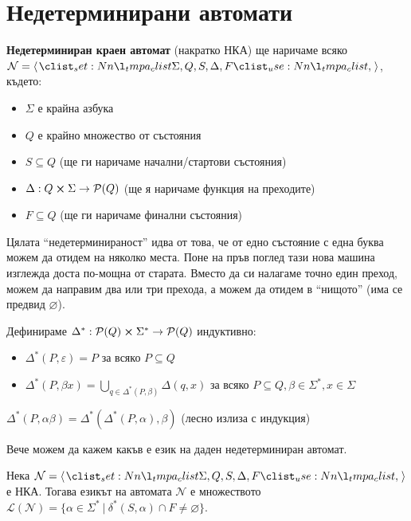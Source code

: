 \section{Недетерминирани автомати}

\begin{definition}
    \textbf{Недетерминиран краен автомат} (накратко НКА) ще наричаме всяко $\mathcal{N} = \opair{\Sigma, Q, S, \Delta, F}$, където:
    \begin{itemize}
        \item $\Sigma$ е крайна азбука
        \item $Q$ е крайно множество от състояния
        \item $S \subseteq Q$ (ще ги наричаме начални/стартови състояния)
        \item $\Delta : Q \cross \Sigma \rightarrow \mathcal{P}(Q)$ (ще я наричаме функция на преходите)
        \item $F \subseteq Q$ (ще ги наричаме финални състояния)
    \end{itemize}
\end{definition}

Цялата ``недетерминираност'' идва от това, че от едно състояние с една буква можем да отидем на няколко места.
Поне на пръв поглед тази нова машина изглежда доста по-мощна от старата.
Вместо да си налагаме точно един преход, можем да направим два или три прехода, а можем да отидем в ``нищото'' (има се предвид $\varnothing$).

\begin{definition}
    Дефинираме $\Delta^* : \mathcal{P}(Q) \cross \Sigma^* \rightarrow \mathcal{P}(Q)$ индуктивно:
    \begin{itemize}
        \item $\Delta^*(P, \varepsilon) = P$ за всяко $P \subseteq Q$
        \item $\Delta^*(P, \beta x) = \bigcup\limits_{q \in \Delta^*(P, \beta)}\Delta(q, x)$ за всяко $P \subseteq Q, \beta \in \Sigma^*, x \in \Sigma$
    \end{itemize}
\end{definition}

\begin{remark}
    $\Delta^*(P, \alpha \beta) = \Delta^*(\Delta^*(P, \alpha), \beta)$ (лесно излиза с индукция)
\end{remark}

Вече можем да кажем какъв е език на даден недетерминиран автомат.

\begin{definition}
    Нека $\mathcal{N} = \opair{\Sigma, Q, S, \Delta, F}$ е НКА.
    Тогава езикът на автомата $\mathcal{N}$ е множеството
    $\mathcal{L}(\mathcal{N}) = \{ \alpha \in \Sigma^* \: | \: \delta^*(S, \alpha) \cap F \neq \varnothing \}$.
\end{definition}

